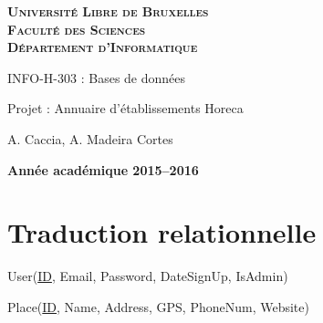 \documentclass[a4paper,10pt]{article}
\begin{document}
\begin{titlepage}
    \begin{center}
        \textbf{\textsc{Université Libre de Bruxelles}}\\
        \textbf{\textsc{Faculté des Sciences}}\\
        \textbf{\textsc{Département d'Informatique}}

        \vfill{}
        \vfill{}

        \begin{center}
            {\Huge INFO-H-303 : Bases de données}
        \end{center}

        {\Huge \par}

        \begin{center}
            {\LARGE Projet : Annuaire d'établissements Horeca}
        \end{center}

        {\Huge \par}

        \begin{center}
            {\large A. Caccia, A. Madeira Cortes}
        \end{center}

        {\Huge \par}
        \vfill{}
        \vfill{}

        {\large\par}
        \vfill{}
        \vfill{}

        \textbf{Année académique 2015--2016}
    \end{center}
\end{titlepage}



\section{Traduction relationnelle}

\noindent User(\underline{ID}, Email, Password, DateSignUp, IsAdmin)

\hspace{-0,5cm}Place(\underline{ID}, Name, Address, GPS, PhoneNum, Website)
\end{document}
